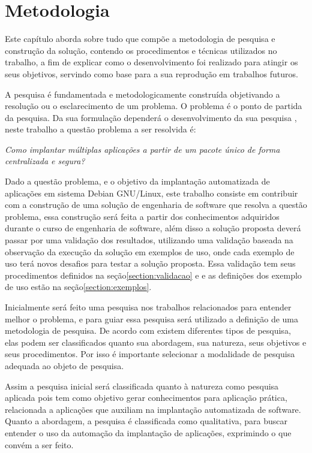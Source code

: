 \chapter{Metodologia}
\label{cap-metodologia}
Este capítulo aborda sobre tudo que compõe a metodologia de pesquisa e construção
da solução, contendo os procedimentos e técnicas utilizados no trabalho, a fim de
explicar como o desenvolvimento foi realizado para atingir os seus objetivos,
servindo como base para a sua reprodução em trabalhos futuros.

A pesquisa é fundamentada e metodologicamente construída objetivando a resolução
ou o esclarecimento de um problema. O problema é o ponto de partida da pesquisa.
Da sua formulação dependerá o desenvolvimento da sua pesquisa
\cite{moresi2003metodologia}, neste trabalho a questão problema a ser resolvida é:

\begin{center}
  \textit{
  Como implantar múltiplas aplicações a partir de um pacote único
  de forma centralizada e segura?
}
\end{center}

Dado a questão problema, e o objetivo da implantação automatizada
de aplicações em sistema Debian GNU/Linux, este trabalho consiste em contribuir
com a construção de uma solução de engenharia de software que resolva a questão
problema, essa construção será feita a partir dos conhecimentos adquiridos durante
o curso de engenharia de software, além disso a solução proposta deverá passar
por uma validação dos resultados, utilizando uma validação baseada na observação
da execução da solução em exemplos de uso, onde cada exemplo de uso terá novos
desafios para testar a solução proposta. Essa validação tem seus procedimentos
definidos na seção\ref{section:validacao} e e as definições dos exemplo de uso
estão na seção\ref{section:exemplos}.

Inicialmente será feito uma pesquisa nos trabalhos relacionados para entender
melhor o problema, e para guiar essa pesquisa será utilizado a definição de uma
metodologia de pesquisa. De acordo com\cite{gerhardt2009metodos} existem diferentes
tipos de pesquisa, elas podem ser classificados quanto sua abordagem, sua natureza,
seus objetivos e seus procedimentos. Por isso é importante selecionar a modalidade
de pesquisa adequada ao objeto de pesquisa.

Assim a pesquisa inicial será classificada quanto à natureza como pesquisa aplicada
pois tem como objetivo gerar conhecimentos para aplicação prática\cite{gerhardt2009metodos},
relacionada a aplicações que auxiliam na implantação automatizada de software.
Quanto a abordagem, a pesquisa é classificada como qualitativa, para buscar entender
o uso da automação da implantação de aplicações, exprimindo o que convém
a ser feito.

